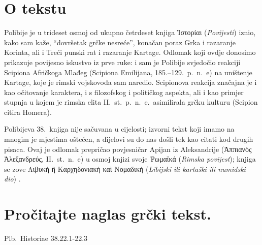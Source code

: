 


\section*{O tekstu}

Polibije je u trideset osmoj od ukupno četrdeset knjiga \textgreek[variant=ancient]{Ἱστορίαι} (\textit{Povijesti}) iznio, kako sam kaže, ``dovršetak grčke nesreće'', konačan poraz Grka i razaranje Korinta, ali i Treći punski rat i razaranje Kartage. Odlomak koji ovdje donosimo prikazuje povijesno iskustvo iz prve ruke: i sam je Polibije svjedočio reakciji Scipiona Afričkoga Mlađeg (Scipiona Emilijana, 185.–129.\ p.~n.~e) na uništenje Kartage, koje je rimski vojskovođa sam naredio. Scipionova reakcija značajna je i kao očitovanje karaktera, i s filozofskog i političkog aspekta, ali i kao primjer stupnja u kojem je rimska elita II.~st.\ p.~n.~e.\ asimilirala grčku kulturu (Scipion citira Homera).

Polibijeva 38.\ knjiga nije sačuvana u cijelosti; izvorni tekst koji imamo na mnogim je mjestima oštećen, a dijelovi su do nas došli tek kao citati kod drugih pisaca. Ovaj je odlomak prepričao povjesničar Apijan iz Aleksandrije \textgreek[variant=ancient]{(Ἀππιανὸς Ἀλεξανδρεύς,} II.~st.\ n.~e) u osmoj knjizi svoje \textgreek[variant=ancient]{Ῥωμαϊκά} (\textit{Rimska povijest}); knjiga se zove \textgreek[variant=ancient]{Λιβυκή ἢ Καρχηδονιακὴ καὶ Νομαδική} (\textit{Libijski ili kartaški ili numidski dio}) .


\section*{Pročitajte naglas grčki tekst.}

Plb.\ Historiae 38.22.1-22.3


\medskip


